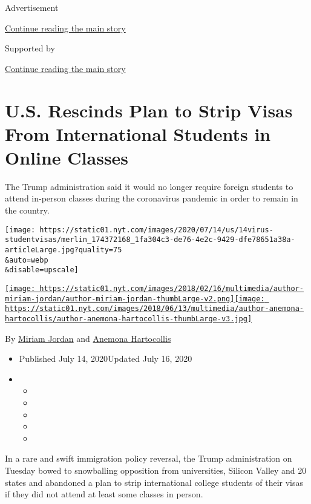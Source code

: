 Advertisement

\protect\hyperlink{after-top}{Continue reading the main story}

Supported by

\protect\hyperlink{after-sponsor}{Continue reading the main story}

\hypertarget{us-rescinds-plan-to-strip-visas-from-international-students-in-online-classes}{%
\section{U.S. Rescinds Plan to Strip Visas From International Students
in Online
Classes}\label{us-rescinds-plan-to-strip-visas-from-international-students-in-online-classes}}

The Trump administration said it would no longer require foreign
students to attend in-person classes during the coronavirus pandemic in
order to remain in the country.

\texttt{[image: https://static01.nyt.com/images/2020/07/14/us/14virus-studentvisas/merlin\_174372168\_1fa304c3-de76-4e2c-9429-dfe78651a38a-articleLarge.jpg?quality=75\\\&auto=webp\\\&disable=upscale]}

\href{https://www.nytimes.com/by/miriam-jordan/}{\texttt{[image: https://static01.nyt.com/images/2018/02/16/multimedia/author-miriam-jordan/author-miriam-jordan-thumbLarge-v2.png]}}\href{https://www.nytimes.com/by/anemona-hartocollis}{\texttt{[image: https://static01.nyt.com/images/2018/06/13/multimedia/author-anemona-hartocollis/author-anemona-hartocollis-thumbLarge-v3.jpg]}}

By \href{https://www.nytimes.com/by/miriam-jordan/}{Miriam Jordan} and
\href{https://www.nytimes.com/by/anemona-hartocollis}{Anemona
Hartocollis}

\begin{itemize}
\item
  Published July 14, 2020Updated July 16, 2020
\item
  \begin{itemize}
  \item
  \item
  \item
  \item
  \item
  \end{itemize}
\end{itemize}

In a rare and swift immigration policy reversal, the Trump
administration on Tuesday bowed to snowballing opposition from
universities, Silicon Valley and 20 states and abandoned a plan to strip
international college students of their visas if they did not attend at
least some classes in person.

